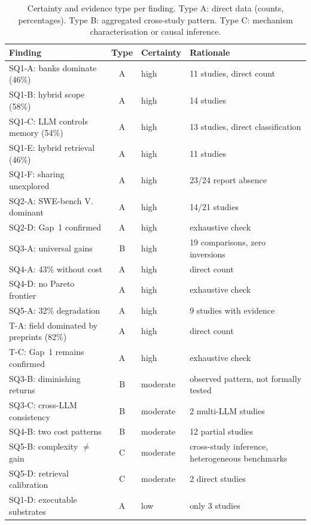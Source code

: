 \begin{table}[htbp]
  \centering
  \caption{Certainty and evidence type per finding. Type A: direct
  data (counts, percentages). Type B: aggregated cross-study pattern.
  Type C: mechanism characterisation or causal inference.}
  \label{tab:certeza}
  \begin{tabularx}{\textwidth}{l c l X}
    \toprule
    Finding & Type & Certainty & Rationale \\
    \midrule
    SQ1-A: banks dominate (46\%) & A & high & 11 studies, direct count \\
    SQ1-B: hybrid scope (58\%) & A & high & 14 studies \\
    SQ1-C: LLM controls memory (54\%) & A & high & 13 studies, direct
      classification \\
    SQ1-E: hybrid retrieval (46\%) & A & high & 11 studies \\
    SQ1-F: sharing unexplored & A & high & 23/24 report absence \\
    SQ2-A: SWE-bench V. dominant & A & high & 14/21 studies \\
    SQ2-D: Gap~1 confirmed & A & high & exhaustive check \\
    SQ3-A: universal gains & B & high & 19 comparisons, zero inversions \\
    SQ4-A: 43\% without cost & A & high & direct count \\
    SQ4-D: no Pareto frontier & A & high & exhaustive check \\
    SQ5-A: 32\% degradation & A & high & 9 studies with evidence \\
    T-A: field dominated by preprints (82\%) & A & high & direct count \\
    T-C: Gap~1 remains confirmed & A & high & exhaustive check \\
    \midrule
    SQ3-B: diminishing returns & B & moderate & observed pattern,
      not formally tested \\
    SQ3-C: cross-LLM consistency & B & moderate & 2 multi-LLM studies \\
    SQ4-B: two cost patterns & B & moderate & 12 partial studies \\
    SQ5-B: complexity $\neq$ gain & C & moderate & cross-study
      inference, heterogeneous benchmarks \\
    SQ5-D: retrieval calibration & C & moderate & 2 direct studies \\
    \midrule
    SQ1-D: executable substrates & A & low & only 3 studies \\
    \bottomrule
  \end{tabularx}
\end{table}
